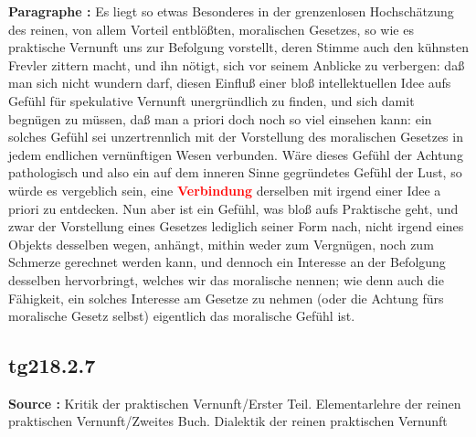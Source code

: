 \documentclass[a4paper,12pt,twoside]{book}
\newcommand{\match}[1]{\textcolor{red}{\textbf{#1}}}
\begin{document}
	\textbf{Paragraphe : }Es liegt so etwas Besonderes in der grenzenlosen Hochschätzung des reinen, von allem Vorteil entblößten, moralischen Gesetzes, so wie es praktische Vernunft uns zur Befolgung vorstellt, deren Stimme auch den kühnsten Frevler zittern macht, und ihn nötigt, sich vor seinem Anblicke zu verbergen: daß man sich nicht wundern darf, diesen Einfluß einer bloß intellektuellen Idee aufs Gefühl für spekulative Vernunft unergründlich zu finden, und sich damit begnügen zu müssen, daß man a priori doch noch so viel einsehen kann: ein solches Gefühl sei unzertrennlich mit der Vorstellung des moralischen Gesetzes in jedem endlichen vernünftigen Wesen verbunden. Wäre dieses Gefühl der Achtung pathologisch und also ein auf dem inneren Sinne gegründetes Gefühl der Lust, so würde es vergeblich sein, eine \match{Verbindung} derselben mit irgend einer Idee a priori zu entdecken. Nun aber ist ein Gefühl, was bloß aufs Praktische geht, und zwar der Vorstellung eines Gesetzes lediglich seiner Form nach, nicht irgend eines Objekts desselben wegen, anhängt, mithin weder zum Vergnügen, noch zum Schmerze gerechnet werden kann, und dennoch ein Interesse an der Befolgung desselben hervorbringt, welches wir das moralische nennen; wie denn auch die Fähigkeit, ein solches  Interesse am Gesetze zu nehmen (oder die Achtung fürs moralische Gesetz selbst) eigentlich das moralische Gefühl ist. 
	
	\subsection*{tg218.2.7} 
	\textbf{Source : }Kritik der praktischen Vernunft/Erster Teil. Elementarlehre der reinen praktischen Vernunft/Zweites Buch. Dialektik der reinen praktischen Vernunft\\  
	
\end{document}
